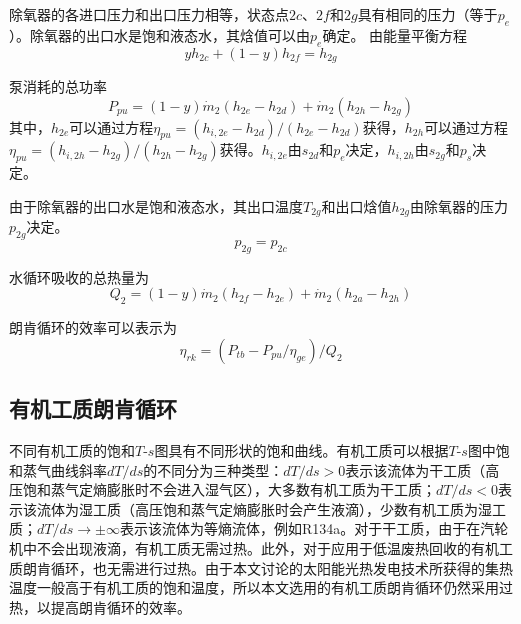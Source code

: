   除氧器的各进口压力和出口压力相等，状态点$2c$、$2f$和$2g$具有相同的压力（等于$p_e$）。除氧器的出口水是饱和液态水，其焓值可以由$p_e$确定。
  由能量平衡方程
  \begin{equation}
  y h_{2c} + (1-y) h_{2f} = h_{2g}
\end{equation}
 
  泵消耗的总功率
\begin{equation}
	P_{pu}=\left(1-y\right)\dot{m}_{2}\left(h_{2e}-h_{2d}\right)+\dot{m}_{2}\left(h_{2h}-h_{2g}\right)
\end{equation}   
其中，$h_{2e}$可以通过方程$\eta_{pu} = (h_{i,2e}-h_{2d})/(h_{2e}-h_{2d})$获得，$h_{2h}$可以通过方程$\eta_{pu} = (h_{i,2h}-h_{2g})/(h_{2h}-h_{2g})$获得。$h_{i,2e}$由$s_{2d}$和$p_e$决定，$h_{i,2h}$由$s_{2g}$和$p_s$决定。

由于除氧器的出口水是饱和液态水，其出口温度$T_{2g}$和出口焓值$h_{2g}$由除氧器的压力$p_{2g}$决定。
\begin{equation}
  p_{2g} = p_{2c}
\end{equation}
    
水循环吸收的总热量为
\begin{equation}
	Q_2=\left(1-y\right)\dot{m}_{2}\left(h_{2f}-h_{2e}\right)+\dot{m}_{2}\left(h_{2a}-h_{2h}\right)
\end{equation}

朗肯循环的效率可以表示为
\begin{equation}
	\eta_{rk}=(P_{tb}-P_{pu}/\eta_{ge})/Q_{2}
\end{equation}

\subsection{有机工质朗肯循环}
  
不同有机工质的饱和$T$-$s$图具有不同形状的饱和曲线。有机工质可以根据$T$-$s$图中饱和蒸气曲线斜率$dT/ds$的不同分为三种类型：$dT / ds > 0$表示该流体为干工质（高压饱和蒸气定熵膨胀时不会进入湿气区），大多数有机工质为干工质；$dT / ds < 0$表示该流体为湿工质（高压饱和蒸气定熵膨胀时会产生液滴），少数有机工质为湿工质；$dT/ds \rightarrow \pm\infty$表示该流体为等熵流体，例如R134a。对于干工质，由于在汽轮机中不会出现液滴，有机工质无需过热。此外，对于应用于低温废热回收的有机工质朗肯循环，也无需进行过热。由于本文讨论的太阳能光热发电技术所获得的集热温度一般高于有机工质的饱和温度，所以本文选用的有机工质朗肯循环仍然采用过热，以提高朗肯循环的效率。

